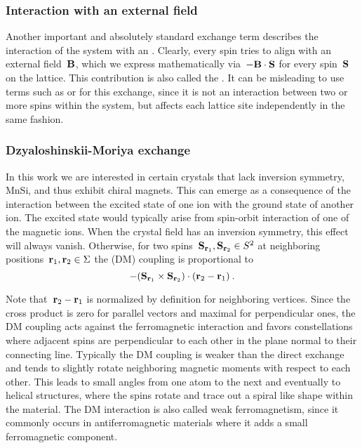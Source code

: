 \subsubsection{Interaction with an external field}

Another important and absolutely standard exchange term describes the
interaction of the system with an . Clearly,
every spin tries to align with an external field~$\B$, which we express
mathematically via~$-\B \cdot \S$ for every spin~$\S$ on the lattice. This
contribution is also called the . It can be misleading to
use terms such as  or  for this
exchange, since it is not an interaction between two or more spins within the
system, but affects each lattice site independently in the same fashion.

\subsubsection{Dzyaloshinskii-Moriya exchange}

In this work we are interested in certain crystals that lack inversion symmetry,
\eg{} MnSi, and thus exhibit chiral magnets. This can emerge as a consequence of
the interaction between the excited state of one ion with the ground state of
another ion. The excited state would typically arise from spin-orbit interaction
of one of the magnetic ions. When the crystal field has an inversion symmetry,
this effect will always vanish. Otherwise, for two spins~$\S_{\r_1}, \S_{\r_2}
\in S^2$ at neighboring positions~$\r_1, \r_2 \in \Sigma$ the
 (DM) coupling is proportional to
%
\begin{equation}
  - (\S_{\r_1} \times \S_{\r_2}) \cdot (\r_2 - \r_1)\:.
\end{equation}
%

Note that~$\r_2 - \r_1$ is normalized by definition for neighboring vertices.
Since the cross product is zero for parallel vectors and maximal for
perpendicular ones, the DM coupling acts against the ferromagnetic interaction
and favors constellations where adjacent spins are perpendicular to each other
in the plane normal to their connecting line. Typically the DM coupling is
weaker than the direct exchange and tends to slightly rotate neighboring
magnetic moments with respect to each other. This leads to small angles from one
atom to the next and eventually to helical structures, where the spins rotate
and trace out a spiral like shape within the material. The DM interaction is
also called weak ferromagnetism, since it commonly occurs in antiferromagnetic
materials where it adds a small ferromagnetic component.

